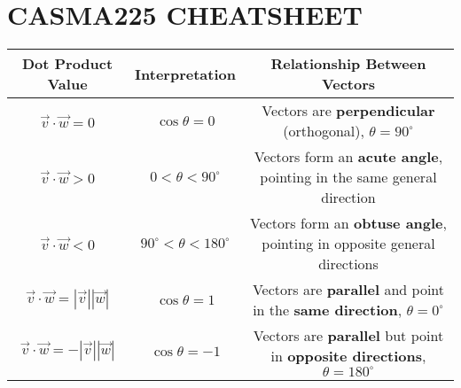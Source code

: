 \documentclass{report}
\begin{document}
\chapter*{CASMA225 CHEATSHEET}

\begin{center}
	\begin{tabular}{|c|c|c|}
		\hline
		\textbf{Dot Product Value}                    & \textbf{Interpretation}         & \textbf{Relationship Between Vectors}                                                         \\
		\hline
		$\vec{v} \cdot \vec{w} = 0$                   & $\cos\theta = 0$                & Vectors are \textbf{perpendicular} (orthogonal), $\theta = 90^\circ$                          \\
		\hline
		$\vec{v} \cdot \vec{w} > 0$                   & $0 < \theta < 90^\circ$         & Vectors form an \textbf{acute angle}, pointing in the same general direction                  \\
		\hline
		$\vec{v} \cdot \vec{w} < 0$                   & $90^\circ < \theta < 180^\circ$ & Vectors form an \textbf{obtuse angle}, pointing in opposite general directions                \\
		\hline
		$\vec{v} \cdot \vec{w} = |\vec{v}||\vec{w}|$  & $\cos\theta = 1$                & Vectors are \textbf{parallel} and point in the \textbf{same direction}, $\theta = 0^\circ$    \\
		\hline
		$\vec{v} \cdot \vec{w} = -|\vec{v}||\vec{w}|$ & $\cos\theta = -1$               & Vectors are \textbf{parallel} but point in \textbf{opposite directions}, $\theta = 180^\circ$ \\
		\hline
	\end{tabular}
\end{center}
\end{document}
